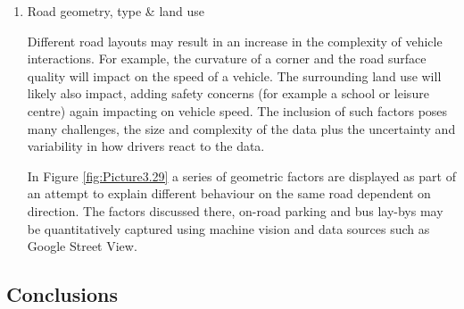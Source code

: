 \documentclass{CUP-JNL-DCE}
\begin{document}
\begin{enumerate}
	\item Road geometry, type \& land use
	
	Different road layouts may result in an increase in the complexity of vehicle interactions. For example, the curvature of a corner and the road surface quality will impact on the speed of a vehicle. The surrounding land use will likely also impact, adding safety concerns (for example a school or leisure centre) again impacting on vehicle speed. The inclusion of such factors poses many challenges, the size and complexity of the data plus the uncertainty and variability in how drivers react to the data.
	
	In Figure \ref{fig:Picture3.29} a series of geometric factors are displayed as part of an attempt to explain different behaviour on the same road dependent on direction. The factors discussed there, on-road parking and bus lay-bys may be quantitatively captured using machine vision and data sources such as Google Street View.
	
\end{enumerate}

\subsection{Conclusions}
\end{document}
